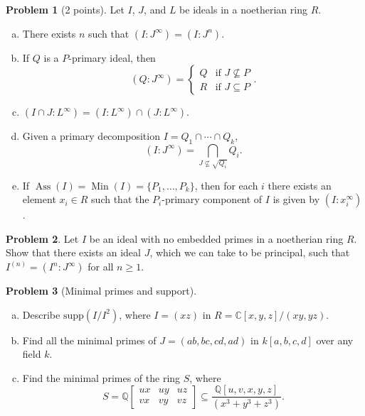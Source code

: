 \documentclass[11pt]{article}
\DeclareMathOperator{\Ass}{Ass}
\DeclareMathOperator{\Min}{Min}
\theoremstyle{definition}
\newtheorem{problem}{Problem}
\begin{document}
\begin{problem}[2 points]
Let $I$, $J$, and $L$ be ideals in a noetherian ring $R$.
\begin{enumerate}[a)]
	\item There exists $n$ such that $(I : J^\infty) = (I : J^n)$.
	\item If $Q$ is a $P$-primary ideal, then
	$$(Q : J^\infty) = \left\lbrace \begin{array}{ll} Q & \textrm{if } J \nsubseteq P \\ R & \textrm{if } J \subseteq P \end{array}\right. .$$

	\item $(I \cap J : L^\infty) = (I : L^\infty) \cap (J : L^\infty)$.
	\item Given a primary decomposition $I = Q_1 \cap \cdots \cap Q_k$,
	$$(I : J^\infty) = \bigcap_{J \nsubseteq \sqrt{Q_i}} Q_i.$$
	\item If $\Ass(I) = \Min(I) = \{ P_1, \ldots, P_k \}$, then for each $i$ there exists an element $x_i \in R$ such that the $P_i$-primary component of $I$ is given by $(I : x_i^\infty)$.
	\end{enumerate}
\end{problem}




\begin{problem}
		Let $I$ be an ideal with no embedded primes in a noetherian ring $R$. Show that there exists an ideal $J$, which we can take to be principal, such that $I^{(n)} = (I^n : J^\infty)$ for all $n \geqslant 1$.
\end{problem}


\begin{problem}[Minimal primes and support]$\,$
	\begin{enumerate}[a)]
		\item Describe $\textrm{supp}(I/I^2)$, where $I = (xz)$ in $R = \mathbb{C}[x,y,z]/(xy,yz)$.		\item Find all the minimal primes of $J = (ab,bc,cd,ad)$ in $k[a,b,c,d]$ over any field $k$.
		\item Find the minimal primes of the ring $S$, where
		$$S = \mathbb{Q} \begin{bmatrix} ux & uy & uz \\ vx & vy & vz \end{bmatrix} \subseteq \frac{\mathbb{Q}[u,v,x,y,z]}{(x^3+y^3+z^3)}.$$
	\end{enumerate}
\end{problem}
\end{document}

